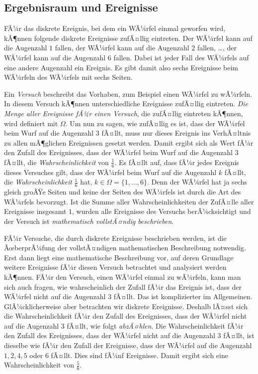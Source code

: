 ﻿\documentclass[12pt,a4paper]{article}
\theoremstyle{definition}
\theoremstyle{plain}
\theoremstyle{remark}
\begin{document}
\subsection{Ergebnisraum und Ereignisse}

FÃ¼r das diskrete Ereignis, bei dem ein WÃ¼rfel einmal geworfen wird, kÃ¶nnen
folgende diskrete Ereignisse zufÃ¤llig eintreten. Der WÃ¼rfel kann auf die
Augenzahl $1$ fallen, der WÃ¼rfel kann auf die Augenzahl $2$ fallen, \ldots,
der WÃ¼rfel kann auf die Augenzahl $6$ fallen. Dabei ist jeder Fall des WÃ¼rfels
auf eine andere Augenzahl ein Ereignis. Es gibt damit also sechs Ereignisse
beim WÃ¼rfeln des WÃ¼rfels mit sechs Seiten.

Ein \textit{Versuch} beschreibt das Vorhaben, zum Beispiel einen WÃ¼rfel zu
wÃ¼rfeln. In diesem Versuch kÃ¶nnen unterschiedliche Ereignisse zufÃ¤llig
eintreten. \textit{Die Menge aller Ereignisse fÃ¼r einen Versuch}, die
zufÃ¤llig eintreten kÃ¶nnen, wird definiert mit $\Omega$. Um nun zu sagen, wie
zufÃ¤llig es ist, dass der WÃ¼rfel beim Wurf auf die Augenzahl $3$ fÃ¤llt, muss
nur dieses Ereignis ins VerhÃ¤ltnis zu allen mÃ¶glichen Ereignissen gesetzt
werden. Damit ergibt sich als Wert fÃ¼r den Zufall des Ereignisses, dass der
WÃ¼rfel beim Wurf auf die Augenzahl $3$ fÃ¤llt, die \textit{Wahrscheinlichkeit}
von $\frac{1}{6}$. Es fÃ¤llt auf, dass fÃ¼r jedes Ereignis dieses Versuches
gilt, dass der WÃ¼rfel beim Wurf auf die Augenzahl $k$ fÃ¤llt, die
\textit{Wahrscheinlichkeit} $\frac{1}{6}$ hat, $k \in \Omega = \{1, \ldots, 6\}$.
Denn der WÃ¼rfel hat ja sechs gleich groÃŸe Seiten und keine der Seiten des
WÃ¼rfels ist durch die Art des WÃ¼rfels bevorzugt. Ist die Summe aller
Wahrscheinlichkeiten der ZufÃ¤lle aller Ereignisse insgesamt $1$, wurden alle
Ereignisse des Versuchs berÃ¼cksichtigt und der Versuch ist
\textit{mathematisch vollstÃ¤ndig beschrieben}.

FÃ¼r Versuche, die durch diskrete Ereignisse beschrieben werden, ist die
ÃœberprÃ¼fung der vollstÃ¤ndigen mathematischen Beschreibung notwendig. Erst dann
liegt eine mathematische Beschreibung vor, auf deren Grundlage weitere
Ereignisse fÃ¼r diesen Versuch betrachtet und analysiert werden kÃ¶nnen. FÃ¼r
den Versuch, einen WÃ¼rfel einmal zu wÃ¼rfeln, kann man sich auch fragen, wie
wahrscheinlich der Zufall fÃ¼r das Ereignis ist, dass der WÃ¼rfel nicht auf die
Augenzahl $3$ fÃ¤llt. Das ist komplizierter im Allgemeinen. GlÃ¼cklicherweise
aber betrachten wir diskrete Ereignisse. Deshalb lÃ¤sst sich die
Wahrscheinlichkeit fÃ¼r den Zufall des Ereignisses, dass der WÃ¼rfel nicht auf
die Augenzahl $3$ fÃ¤llt, wie folgt \textit{abzÃ¤hlen}. Die Wahrscheinlichkeit
fÃ¼r den Zufall des Ereignisses, dass der WÃ¼rfel nicht auf die Augenzahl $3$
fÃ¤llt, ist dieselbe wie fÃ¼r den Zufall der Ereignisse, dass der WÃ¼rfel auf
die Augenzahl $1, 2, 4, 5$ oder $6$ fÃ¤llt. Dies sind fÃ¼nf Ereignisse. Damit
ergibt sich eine Wahrscheinlichkeit von $\frac{5}{6}$.
\end{document}
